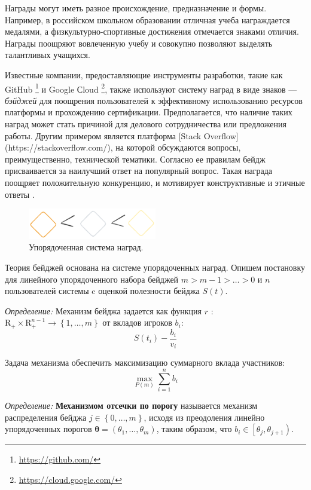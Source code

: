 Награды могут иметь разное происхождение, предназначение и формы. Например, в российском школьном образовании отличная учеба награждается медалями, 
а физкультурно-спортивные достижения отмечается знаками отличия. Награды поощряют вовлеченную учебу и совокупно позволяют выделять талантливых учащихся. 

Известные компании, предоставляющие инструменты разработки, такие как GitHub \footnote{\url{https://github.com/}}
и Google Сloud \footnote{\url{https://cloud.google.com/}}, также используют систему наград в виде знаков --- \textit{бэйджей}
для поощрения пользователей к эффективному использованию ресурсов платформы и прохождению сертификации. 
Предполагается, что наличие таких наград может стать причиной для делового сотрудничества или предложения работы. 
Другим примером является платформа [Stack Overflow](https://stackoverflow.com/), на которой обсуждаются вопросы, преимущественно, технической тематики.
Согласно ее правилам бейдж присваивается за наилучший ответ на популярный вопрос. Такая награда поощряет положительную конкуренцию, и мотивирует 
конструктивные и этичные ответы \cite{yanovsky2021one}.
\begin{figure}[h]
    \centering
    \includegraphics[width=0.5\textwidth]{assets/pedagogic/social/badge.excalidraw.png}
    \caption{Упорядоченная система наград.}
    \label{badge}
\end{figure}

Теория бейджей основана на системе упорядоченных наград. Опишем постановку для линейного
упорядоченного набора бейджей $m > m-1 > \dots > 0$ и $n$ пользователей системы c оценкой полезности бейджа $S(t)$. 

\textit{Определение:} Механизм бейджа задается как функция $r$ : $\mathrm{R}_{+} \times \mathrm{R}_{+}^{n-1} \rightarrow \left\{1, \dots,m \right\}$ 
от вкладов игроков $b_i$:
\begin{equation}
    S(t_i) - \frac{b_i}{v_i}
\end{equation}

Задача механизма обеспечить максимизацию суммарного вклада участников:
\begin{equation}
    \max_{P(m)} \sum_{i=1}^n b_i
\end{equation}

\textit{Определение:} \textbf{Механизмом отсечки по порогу} называется механизм распределения
бейджа $j \in \left\{0,\dots,m\right\}$, исходя из преодоления линейно упорядоченных порогов
$\mathbf{\theta} =(\theta_1,\dots,\theta_m)$, таким образом, что $b_i \in \left[\theta_j,\theta_{j+1}\right)$.


